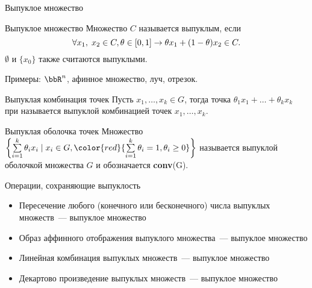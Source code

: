 \documentclass[12pt,russian]{beamer}
\begin{document}
\begin{frame}{Выпуклое множество}
\small
\begin{block}{Выпуклое множество}
Множество $C$ называется выпуклым, если 
\vspace{-4mm}
\[
\forall x_1, \; x_2 \in C, \theta \in [0, 1] \rightarrow \theta x_1 + (1 - \theta)x_2 \in C.
\vspace{-4mm}
\]
$\emptyset$ и $\{ x_0 \}$ также считаются выпуклыми.
\end{block}
Примеры: $\bbR^n$, афинное множество, луч, отрезок.
\begin{block}{Выпуклая комбинация точек}
Пусть $x_1, \ldots, x_k \in G$, тогда точка $\theta_1 x_1 + \ldots + \theta_k x_k$ при {} называется выпуклой комбинацией точек $x_1,\ldots,x_k$.
\end{block}

\begin{block}{Выпуклая оболочка точек}
Множество $\left\{ \sum\limits_{i=1}^k \theta_i x_i \; | \; x_i \in G, {\color{red}{\sum\limits_{i=1}^k \theta_i = 1, \theta_i \geq 0}} \right\}$ называется выпуклой оболочкой множества $G$ и обозначается \textbf{conv}(G).
\end{block}

\end{frame}

\begin{frame}{Операции, сохраняющие выпуклость}
\begin{itemize}
\item Пересечение любого (конечного или бесконечного) числа выпуклых множеств~--- выпуклое множество
\item Образ аффинного отображения выпуклого множества~--- выпуклое множество
\item Линейная комбинация выпуклых множеств~--- выпуклое множество
\item Декартово произведение выпуклых множеств~--- выпуклое множество
\end{itemize}
\end{frame}
\end{document}
